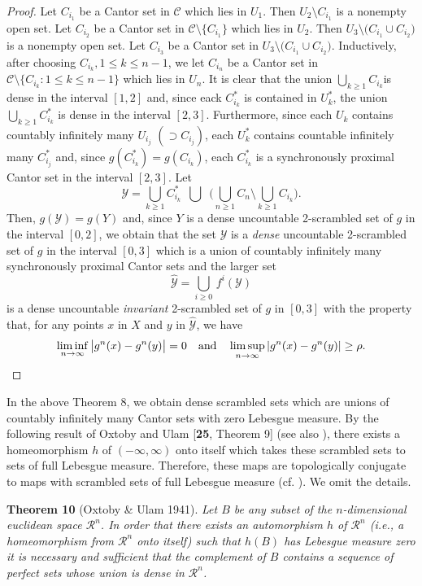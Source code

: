 \documentclass[12pt]{article}
\begin{document}
\begin{proof}
Let $C_{i_1}$ be a Cantor set in $\mathcal C$ which lies in $U_1$.  Then $U_2 \setminus C_{i_1}$ is a nonempty open set.  Let $C_{i_2}$ be a Cantor set in $\mathcal C \setminus \{ C_{i_1} \}$ which lies in $U_2$.  Then $U_3 \setminus \big(C_{i_1} \cup C_{i_2}\big)$ is a nonempty open set.  Let $C_{i_3}$ be a Cantor set in $U_3 \setminus \big(C_{i_1} \cup C_{i_2}\big)$.           Inductively, after choosing $C_{i_k}, 1 \le k \le n-1$, we let $C_{i_n}$ be a Cantor set in $\mathcal C \setminus \{ C_{i_k} : 1 \le k \le n-1 \}$ which lies in $U_n$.  It is clear that the union $\bigcup_{k \ge 1} C_{i_k}$is dense in the interval $[1, 2]$ and, since eack $C_{i_k}^*$ is contained in $U_k^*$, the union $\bigcup_{k \ge 1} C_{i_k}^*$ is dense in the interval $[2, 3]$.  Furthermore, since each $U_k$ contains countably infinitely many $U_{i_j}$ $(\supset C_{i_j})$, each $U_k^*$ contains countable infinitely many $C_{i_j}^*$ and, since $g(C_{i_k}^*) = g(C_{i_k})$, each $C_{i_k}^*$ is a synchronously proximal Cantor set in the interval $[2, 3]$.  Let $$\mathcal Y = \bigcup_{k \ge 1} C_{i_k}^* \,\,\, \bigcup \,\,\, \bigg( \bigcup_{n \ge 1} C_n \setminus \bigcup_{k \ge 1} C_{i_k} \bigg).$$Then, $g(\mathcal Y) = g(Y)$ and, since $Y$ is a dense uncountable 2-scrambled set of $g$ in the interval $[0, 2]$, we obtain that the set $\mathcal Y$ is a {\it dense} uncountable 2-scrambled set of $g$ in the interval $[0, 3]$ which is a union of countably infinitely many synchronously proximal Cantor sets and the larger set $$\widehat {\mathcal Y} = \bigcup_{i \ge 0} \, f^i(\mathcal Y)$$ is a dense uncountable {\it invariant} 2-scrambled set of $g$ in $[0, 3]$ with the property that, for any points $x$ in $X$ and $y$ in $\widehat {\mathcal Y}$, we have 
\[
\liminf_{n \to \infty} \big|g^n(x) - g^n(y)\big| = 0 \quad \text{and} \quad \limsup_{n \to \infty} |g^n(x) - g^n(y)| \ge \rho.\qedhere
\]
\end{proof}
In the above Theorem 8, we obtain dense scrambled sets which are unions of countably infinitely many Cantor sets with zero Lebesgue measure.  By the following result of Oxtoby and Ulam {[\bf{25}}, Theorem 9] \big(see also {\bf\cite{go}}\big), there exists a homeomorphism $h$ of $(-\infty, \infty)$ onto itself which takes these scrambled sets to sets of full Lebesgue measure.  Therefore, these maps are topologically conjugate to maps with scrambled sets of full Lebesgue measure (cf. {\bf\cite{bab}}).  We omit the details.  

\noindent
{\bf Theorem 10} {\rm (Oxtoby \& Ulam 1941}{\bf\cite{ox}}).
{\it Let $B$ be any subset of the $n$-dimensional euclidean space $\mathcal R^n$.  In order that there exists an automorphism $h$ of $\mathcal R^n$ (i.e., a homeomorphism from $\mathcal R^n$ onto itself) such that $h(B)$ has Lebesgue measure zero it is necessary and sufficient that the complement of $B$ contains a sequence of perfect sets whose union is dense in $\mathcal R^n$.}
\end{document}
